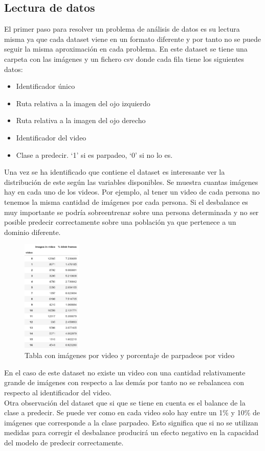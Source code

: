 \documentclass[12pt]{article}
\begin{document}
    \subsection*{Lectura de datos}
    El primer paso para resolver un problema de análisis de datos es su lectura misma ya que cada dataset viene en un
    formato diferente y por tanto no se puede seguir la misma aproximación en cada problema.
    En este dataset se tiene una carpeta con las imágenes y un fichero csv donde cada fila tiene los siguientes datos:
    \begin{itemize}
        \item Identificador único
        \item Ruta relativa a la imagen del ojo izquierdo
        \item Ruta relativa a la imagen del ojo derecho
        \item Identificador del video
        \item Clase a predecir. ‘1’ si es parpadeo, ‘0’ si no lo es.
    \end{itemize}

    Una vez se ha identificado que contiene el dataset es interesante ver la distribución de este según las variables
    disponibles.
    Se muestra cuantas imágenes hay en cada uno de los videos.
    Por ejemplo, al tener un video de cada persona no tenemos la misma cantidad de imágenes por cada persona.
    Si el desbalance es muy importante se podría sobreentrenar sobre una persona determinada y no ser posible predecir
    correctamente sobre una población ya que pertenece a un dominio diferente.\\
    \begin{figure} %
        \centering
        \includegraphics[width=0.25\textwidth]{drtA5y}
        \caption{Tabla con imágenes por video y porcentaje de parpadeos por video}
    \end{figure}
    En el caso de este dataset no existe un video con una cantidad relativamente grande de imágenes con respecto a
    las demás por tanto no se rebalancea con respecto al identificador del video.\\
    Otra observación del dataset que si que se tiene en cuenta es el balance de la clase a predecir.
    Se puede ver como en cada video solo hay entre un 1\% y 10\% de imágenes que corresponde a la clase parpadeo.
    Esto significa que si no se utilizan medidas para corregir el desbalance producirá un efecto negativo en la
    capacidad del modelo de predecir correctamente.
\end{document}
